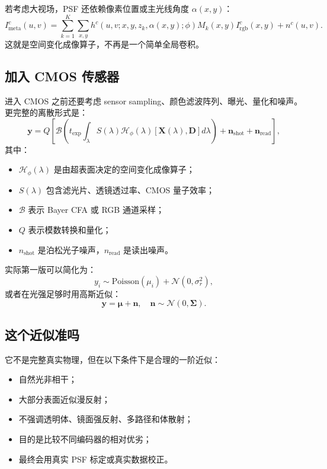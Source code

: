 \documentclass[11pt,a4paper,fontset=none]{ctexart}
\begin{document}
若考虑大视场，PSF 还依赖像素位置或主光线角度 $\alpha(x,y)$：
\begin{equation}
  I_{\mathrm{meta}}^c(u,v)
  =
  \sum_{k=1}^{K}
  \sum_{x,y}
  h^c(u,v;x,y,z_k,\alpha(x,y);\phi)
  M_k(x,y) I_{\mathrm{rgb}}^c(x,y)
  +
  n^c(u,v).
  \label{eq:space_variant}
\end{equation}
这就是空间变化成像算子，不再是一个简单全局卷积。

\subsection{加入 CMOS 传感器}

进入 CMOS 之前还要考虑 sensor sampling、颜色滤波阵列、曝光、量化和噪声。更完整的离散形式是：
\begin{equation}
  \bm y
  =
  Q\left[
  \mathcal B
  \left(
  t_{\mathrm{exp}}
  \int_\lambda
  S(\lambda)
  \mathcal H_\phi(\lambda)
  [\bm X(\lambda),\bm D]
  d\lambda
  \right)
  +\bm n_{\mathrm{shot}}
  +\bm n_{\mathrm{read}}
  \right],
  \label{eq:sensor_model}
\end{equation}
其中：
\begin{itemize}
  \item $\mathcal H_\phi(\lambda)$ 是由超表面决定的空间变化成像算子；
  \item $S(\lambda)$ 包含滤光片、透镜透过率、CMOS 量子效率；
  \item $\mathcal B$ 表示 Bayer CFA 或 RGB 通道采样；
  \item $Q$ 表示模数转换和量化；
  \item $n_{\mathrm{shot}}$ 是泊松光子噪声，$n_{\mathrm{read}}$ 是读出噪声。
\end{itemize}

实际第一版可以简化为：
\begin{equation}
  y_i \sim \mathrm{Poisson}(\mu_i)+\mathcal N(0,\sigma_r^2),
\end{equation}
或者在光强足够时用高斯近似：
\begin{equation}
  \bm y=\bm \mu+\bm n,\quad \bm n\sim\mathcal N(0,\bm\Sigma).
\end{equation}

\subsection{这个近似准吗}

它不是完整真实物理，但在以下条件下是合理的一阶近似：
\begin{itemize}
  \item 自然光非相干；
  \item 大部分表面近似漫反射；
  \item 不强调透明体、镜面强反射、多路径和体散射；
  \item 目的是比较不同编码器的相对优劣；
  \item 最终会用真实 PSF 标定或真实数据校正。
\end{itemize}
\end{document}
